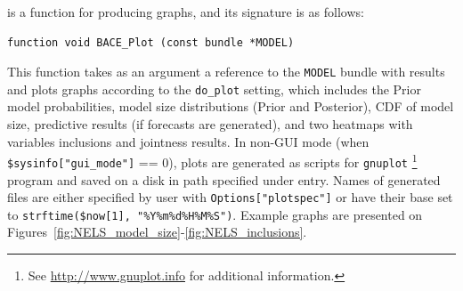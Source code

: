 \subsubsection{}\label{sec:BACE_Plot()}
 is a function for producing graphs,
and its signature is as follows:
\begin{lstlisting}
function void BACE_Plot (const bundle *MODEL)
\end{lstlisting}
This function takes as an argument a reference to the
\lstinline!MODEL! bundle with  results and
plots graphs according to the \lstinline!do_plot! setting,
which includes the Prior model probabilities, model size
distributions (Prior and Posterior), CDF of model size,
predictive results (if forecasts are generated), and two
heatmaps with variables inclusions and jointness results.
In non-GUI mode (when \lstinline!$sysinfo["gui_mode"]! == 0),
plots are generated as scripts for \texttt{gnuplot}%
\footnote{See \url{http://www.gnuplot.info} for additional
	information.} program and saved on a disk in path
specified under  entry. Names of
generated files are either specified by user with
\lstinline!Options["plotspec"]! or have their base set
to \lstinline!strftime($now[1], "%Y%m%d%H%M%S")!.
Example graphs are presented on
Figures~\ref{fig:NELS_model_size}-\ref{fig:NELS_inclusions}.
